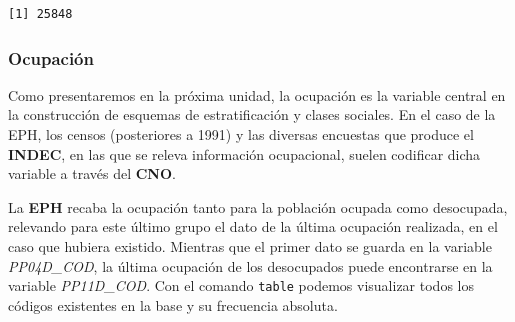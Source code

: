 \documentclass[
]{article}
\newenvironment{Shaded}{\begin{snugshade}}{\end{snugshade}}
\newcommand{\FunctionTok}[1]{\textcolor[rgb]{0.13,0.29,0.53}{\textbf{#1}}}
\newcommand{\NormalTok}[1]{#1}
\newcommand{\SpecialCharTok}[1]{\textcolor[rgb]{0.81,0.36,0.00}{\textbf{#1}}}
\begin{document}
\begin{verbatim}
[1] 25848
\end{verbatim}

\hypertarget{ocupaciuxf3n-1}{%
\subsubsection{Ocupación}\label{ocupaciuxf3n-1}}

Como presentaremos en la próxima unidad, la ocupación es la variable central en la construcción de esquemas de estratificación y clases sociales. En el caso de la EPH, los censos (posteriores a 1991) y las diversas encuestas que produce el \textbf{INDEC}, en las que se releva información ocupacional, suelen codificar dicha variable a través del \textbf{CNO}.

La \textbf{EPH} recaba la ocupación tanto para la población ocupada como desocupada, relevando para este último grupo el dato de la última ocupación realizada, en el caso que hubiera existido. Mientras que el primer dato se guarda en la variable \emph{PP04D\_COD}, la última ocupación de los desocupados puede encontrarse en la variable \emph{PP11D\_COD}. Con el comando \texttt{table} podemos visualizar todos los códigos existentes en la base y su frecuencia absoluta.

\begin{Shaded}
\end{Shaded}
\end{document}
